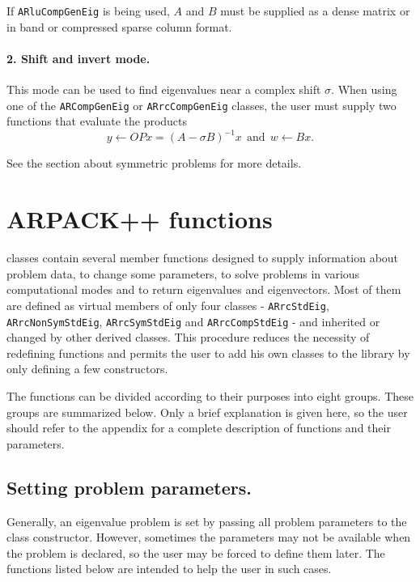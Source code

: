 If \texttt{ARluCompGenEig} is being used, $A$ and $B$ must be supplied as a dense matrix or in band or compressed sparse column format.

\paragraph{2. Shift and invert mode.}
This mode can be used to find eigenvalues near a complex shift $\sigma$. When using one of the \texttt{ARCompGenEig} or \texttt{ARrcCompGenEig} classes, the user must supply two functions that evaluate the products
\[y\leftarrow OPx=(A-\sigma B)^{-1} x \ \ \text{and} \ \ w\leftarrow Bx.\]

See the section about symmetric problems for more details.

\section{ARPACK++ functions}

\ARPP{} classes contain several member functions designed to supply information about problem data, to change some parameters, to solve problems in various computational modes and to return eigenvalues and eigenvectors. Most of them are defined as virtual members of only four classes - \texttt{ARrcStdEig}, \texttt{ARrcNonSymStdEig}, \texttt{ARrcSymStdEig} and \texttt{ARrcCompStdEig} - and inherited or changed by other derived classes. This procedure reduces the necessity of redefining functions and permits the user to add his own classes to the library by only defining a few constructors.

The functions can be divided according to their purposes into eight groups. These groups are summarized below. Only a brief explanation is given here, so the user should refer to the appendix for a complete description of \ARPP{} functions and their parameters.

\subsection{Setting problem parameters.}

Generally, an eigenvalue problem is set by passing all problem parameters to the class constructor. However, sometimes the parameters may not be available when the problem is declared, so the user may be forced to define them later. The functions listed below are intended to help the user in such cases.

